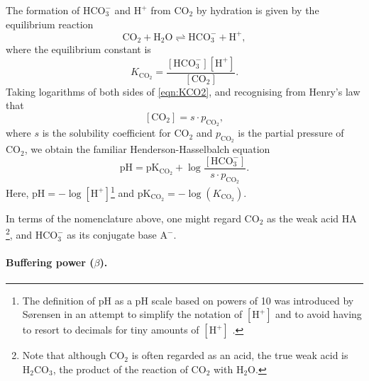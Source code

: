 \documentclass[fleqn,10pt]{physiome}
\begin{document}
The formation of $\mathrm{HCO_3^-}$ and $\mathrm{H^+}$ from $\mathrm{CO_2}$ by hydration is given by the equilibrium reaction
\begin{equation*}
\mathrm{CO_2 + H_2O \rightleftharpoons HCO_3^- + H^+},
\end{equation*}
where the equilibrium constant is
\begin{equation}
K_\mathrm{CO_2}=\dfrac{\mathrm{[HCO_3^-][H^+]}}{\mathrm{[CO_2]}}.
\label{eqn:KCO2}
\end{equation}
Taking logarithms of both sides of \autoref{eqn:KCO2}, and recognising from Henry's law that
\begin{equation}
\mathrm{[CO_2]}=s\cdot p_\mathrm{CO_2},
\end{equation}
where $s$ is the solubility coefficient for $\mathrm{CO_2}$ and $p_\mathrm{CO_2}$ is the partial pressure of $\mathrm{CO_2}$, we obtain the familiar Henderson-Hasselbalch equation
\begin{equation}
\mathrm{pH}=\mathrm{pK_{CO_2}}+\log{\dfrac{\mathrm{[HCO_3^-]}}{s\cdot p_\mathrm{CO_2}}}.
\end{equation}
Here, $\mathrm{pH}=-\log[\mathrm{H^+}]$\footnote{The definition of $\mathrm{pH}$ as a $\mathrm{pH}$ scale based on powers of 10 was introduced by S{\o}rensen in an attempt to simplify the notation of $\mathrm{[H^+]}$ and to avoid having to resort to decimals for tiny amounts of $\mathrm{[H^+]}$ \citep{sorensen2007messung}.} and $\mathrm{pK_{CO_2}}=-\log(K_\mathrm{CO_2})$.

In terms of the nomenclature above, one might regard $\mathrm{CO_2}$ as the weak acid $\mathrm{HA}$\footnote{Note that although $\mathrm{CO_2}$ is often regarded as an acid, the true weak acid is $\mathrm{H_2CO_3}$, the product of the reaction of $\mathrm{CO_2}$ with $\mathrm{H_2O}$.}, and $\mathrm{HCO_3^-}$ as its conjugate base $\mathrm{A^-}$.

\paragraph{Buffering power ($\beta$).}
\end{document}
